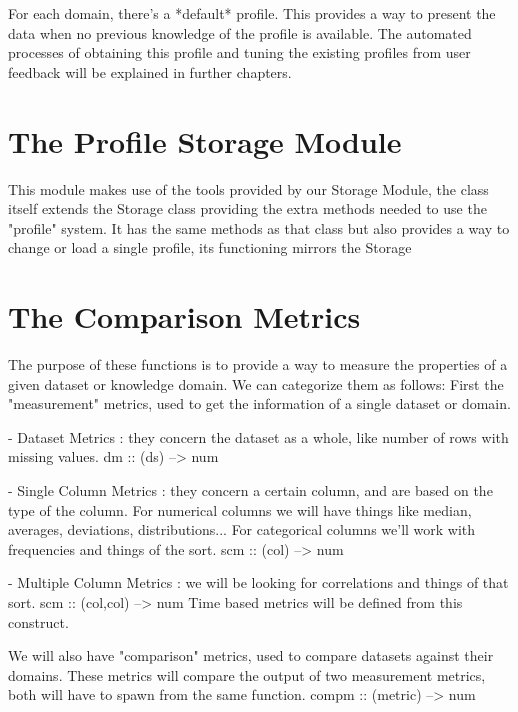 For each domain, there's a *default* profile. This provides a way to present the data when no previous knowledge of the profile is available. The automated processes of obtaining this profile and tuning the existing profiles from user feedback will be explained in further chapters.


\section{The Profile Storage Module}
\label{cap2:sec:profilestorage}

This module makes use of the tools provided by our Storage Module, the class itself extends the Storage class providing the extra methods needed to use the "profile" system.
It has the same methods as that class but also provides a way to change or load a single profile, its functioning mirrors the Storage

\section{The Comparison Metrics}
\label{cap2:sec:metrics}

The purpose of these functions is to provide a way to measure the properties of a given dataset or knowledge domain.
We can categorize them as follows:
First the "measurement" metrics, used to get the information of a single dataset or domain.

    - Dataset Metrics : they concern the dataset as a whole, like number of rows with missing values.
        dm :: (ds) --> num
        
    - Single Column Metrics : they concern a certain column, and are based on the type of the column.
        For numerical columns we will have things like median, averages, deviations, distributions...
        For categorical columns we'll work with frequencies and things of the sort.
        scm :: (col) --> num
        
    - Multiple Column Metrics : we will be looking for correlations and things of that sort.
        scm :: (col,col) --> num 
        Time based metrics will be defined from this construct.

We will also have "comparison" metrics, used to compare datasets against their domains.
These metrics will compare the output of two measurement metrics, both will have to
spawn from the same function.
    compm :: (metric) --> num

